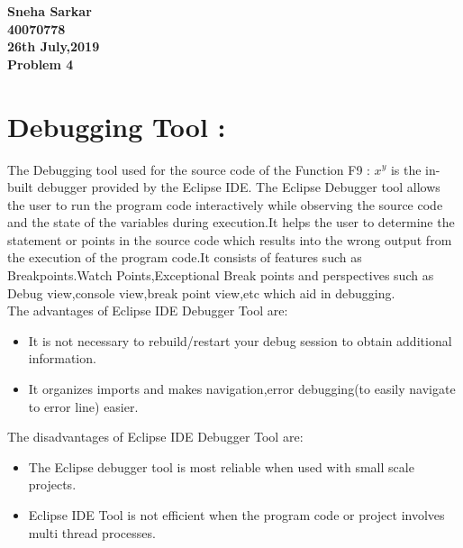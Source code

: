 \documentclass[10pt]{article}
\begin{document}
\large\textbf{Sneha Sarkar}\\ 
\indent\Large \textbf{40070778}\\
\indent\Large \textbf{26th July,2019}\\
\indent\Large\textbf{Problem 4}\\
\section{Debugging Tool :}
The Debugging tool used for the source code of the Function F9 : $x^y$ is the in-built debugger provided by the Eclipse IDE. The Eclipse Debugger tool allows the user to run the program code interactively while observing the source code and the state of the variables during execution.It helps the user to determine the statement or points in the source code which results into the wrong output from the execution of the program code.It consists of features such as Breakpoints.Watch Points,Exceptional Break points and perspectives such as Debug view,console view,break point view,etc which aid in debugging.\\
The advantages of Eclipse IDE Debugger Tool are:
\begin{itemize}
  \item It is not necessary to rebuild/restart your debug session to obtain additional information.
  \item It organizes imports and makes navigation,error debugging(to easily navigate to error line) easier.
\end{itemize}
The disadvantages of Eclipse IDE Debugger Tool are:
\begin{itemize}
  \item The Eclipse debugger tool is most reliable when used with small scale projects.
  \item Eclipse IDE Tool is not efficient when the program code or project involves multi thread processes.
\end{itemize}
\end{document}
